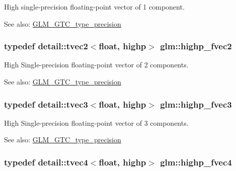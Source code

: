 High single-precision floating-point vector of 1 component. \begin{Desc}
\item[See also:]\hyperlink{group__gtc__type__precision}{GLM\_\-GTC\_\-type\_\-precision} \end{Desc}
\hypertarget{group__gtc__type__precision_gb58ecc53699d45f4f88d67bbff084c54}{
\subsubsection[highp\_\-fvec2]{\setlength{\rightskip}{0pt plus 5cm}typedef detail::tvec2$<$float, highp$>$ {\bf glm::highp\_\-fvec2}}}
\label{group__gtc__type__precision_gb58ecc53699d45f4f88d67bbff084c54}


High Single-precision floating-point vector of 2 components. \begin{Desc}
\item[See also:]\hyperlink{group__gtc__type__precision}{GLM\_\-GTC\_\-type\_\-precision} \end{Desc}
\hypertarget{group__gtc__type__precision_g79b821fc8ae989b12bb43e2cd3932580}{
\subsubsection[highp\_\-fvec3]{\setlength{\rightskip}{0pt plus 5cm}typedef detail::tvec3$<$float, highp$>$ {\bf glm::highp\_\-fvec3}}}
\label{group__gtc__type__precision_g79b821fc8ae989b12bb43e2cd3932580}


High Single-precision floating-point vector of 3 components. \begin{Desc}
\item[See also:]\hyperlink{group__gtc__type__precision}{GLM\_\-GTC\_\-type\_\-precision} \end{Desc}
\hypertarget{group__gtc__type__precision_ge0de2413648d89bf5a8e598e5520a439}{
\subsubsection[highp\_\-fvec4]{\setlength{\rightskip}{0pt plus 5cm}typedef detail::tvec4$<$float, highp$>$ {\bf glm::highp\_\-fvec4}}}
\label{group__gtc__type__precision_ge0de2413648d89bf5a8e598e5520a439}


